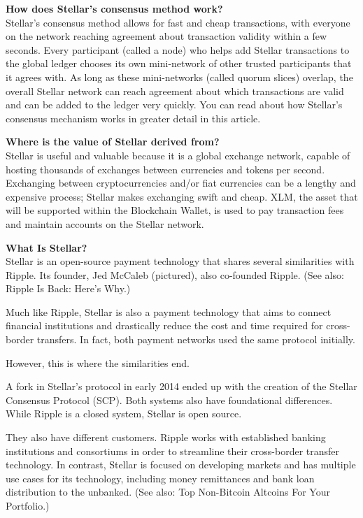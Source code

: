 \documentclass[a4paper,12pt]{/home/armando/Documentos/Cursos/LaTeX/Plantillas/lib/pub}
\begin{document}
	\textbf{How does Stellar’s consensus method work?}\\
	Stellar’s consensus method allows for fast and cheap transactions, with everyone on the network reaching agreement about transaction validity within a few seconds. Every participant (called a node) who helps add Stellar transactions to the global ledger chooses its own mini-network of other trusted participants that it agrees with. As long as these mini-networks (called quorum slices) overlap, the overall Stellar network can reach agreement about which transactions are valid and can be added to the ledger very quickly. You can read about how Stellar’s consensus mechanism works in greater detail in this article.
	
	\textbf{Where is the value of Stellar derived from?}\\
	Stellar is useful and valuable because it is a global exchange network, capable of hosting thousands of exchanges between currencies and tokens per second. Exchanging between cryptocurrencies and/or fiat currencies can be a lengthy and expensive process; Stellar makes exchanging swift and cheap. XLM, the asset that will be supported within the Blockchain Wallet, is used to pay transaction fees and maintain accounts on the Stellar network.
	
	\textbf{What Is Stellar?}\\ 
	Stellar is an open-source payment technology that shares several similarities with Ripple. Its founder, Jed McCaleb (pictured), also co-founded Ripple. (See also: Ripple Is Back: Here's Why.)
	
	Much like Ripple, Stellar is also a payment technology that aims to connect financial institutions and drastically reduce the cost and time required for cross-border transfers. In fact, both payment networks used the same protocol initially.     
	
	However, this is where the similarities end. 
	
	A fork in Stellar’s protocol in early 2014 ended up with the creation of the Stellar Consensus Protocol (SCP). Both systems also have foundational differences. While Ripple is a closed system, Stellar is open source.
	
	They also have different customers. Ripple works with established banking institutions and consortiums in order to streamline their cross-border transfer technology. In contrast, Stellar is focused on developing markets and has multiple use cases for its technology, including money remittances and bank loan distribution to the unbanked. (See also: Top Non-Bitcoin Altcoins For Your Portfolio.) 
	
\end{document}
